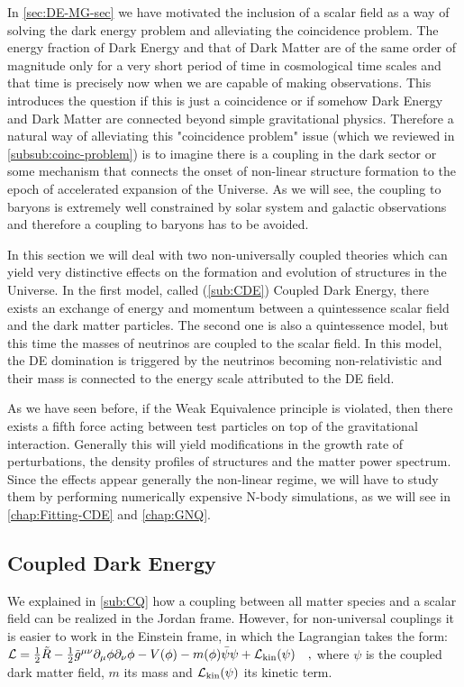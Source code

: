 In \cref{sec:DE-MG-sec} we have motivated the inclusion of a scalar field as a 
way of solving the dark energy problem and alleviating the coincidence problem.
The energy fraction of Dark Energy and that of Dark Matter are of the same
order of magnitude only for a very short period of time in cosmological time scales and that time is precisely
now when we are capable of making observations. This introduces the question if this is just a coincidence or 
if somehow Dark Energy and Dark Matter are connected beyond simple gravitational physics.
Therefore a natural way of alleviating this "coincidence problem" issue (which we reviewed in \cref{subsub:coinc-problem})
is to imagine there is a coupling in the dark sector or some mechanism that connects the onset of non-linear 
structure formation to the epoch of accelerated expansion of the Universe. As we will see, the coupling to baryons 
is extremely well constrained by solar system and galactic observations and therefore a coupling to baryons 
has to be avoided.

In this section we will deal with two non-universally coupled theories which can yield very distinctive 
effects on the formation and evolution of structures in the Universe.
In the first model, called (\cref{sub:CDE}) Coupled Dark Energy, there exists an exchange of energy and momentum
between a quintessence scalar field and the dark matter particles. 
The second one is also a quintessence model, but this time the masses of neutrinos are 
coupled to the scalar field. In this model, the DE domination is triggered by the neutrinos becoming non-relativistic
and their mass is connected to the energy scale attributed to the DE field.

As we have seen before, if the Weak Equivalence principle is violated, then there exists a fifth force acting between test
particles on top of the gravitational interaction. Generally this will yield modifications in the growth rate of perturbations, 
the density profiles of structures and the matter power spectrum. Since the effects appear generally the non-linear regime,
we will have to study them by performing numerically expensive N-body simulations, as we will see in \cref{chap:Fitting-CDE}
and \cref{chap:GNQ}.


\subsection{Coupled Dark Energy \label{sub:CDE}}

We explained in \cref{sub:CQ} how a coupling between all matter species and a scalar field can be realized in the Jordan frame.
However, for non-universal couplings it is easier to work in the Einstein frame, in which the Lagrangian takes the form:
\beeqalsp$\label{eq:CDE-Lagrangian}
\mathcal{L} = \frac{1}{2} \tilde R - \frac{1}{2} \tilde{g}^{\mu \nu}  \partial_{\mu}\phi \partial_{\nu}\phi 
- V(\phi) - m(\phi) \bar{\psi} \psi + \mathcal{L}_{\rm kin}(\psi) \quad,
$
where $\psi$ is the coupled dark matter field, $m$ its mass and $\mathcal{L}_{\rm kin}(\psi)$
its kinetic term.

